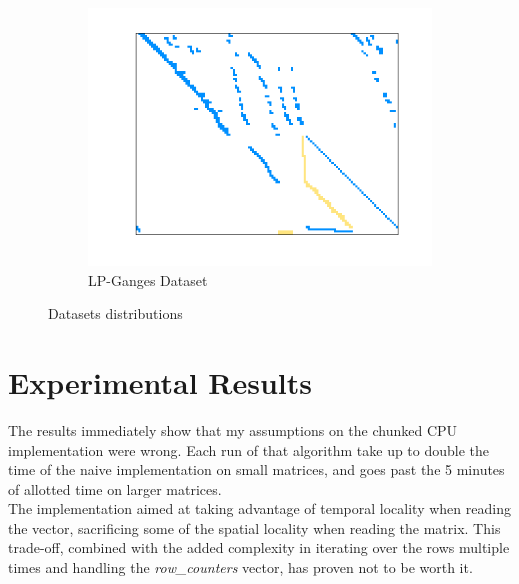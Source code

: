 \documentclass[conference]{IEEEtran}
\begin{document}
\begin{figure}
\begin{subfigure}[b]{0.45\linewidth}
        \includegraphics[width=\linewidth]{images/lp_ganges.png}
        \caption{LP-Ganges Dataset}
        \label{fig:lp_ganges}
    \end{subfigure}
    
    \caption{Datasets distributions}
    \label{fig:Dataset-images}
\end{figure}

\section{Experimental Results}
% 

The results immediately show that my assumptions on the chunked CPU implementation were wrong. Each run of that algorithm take up to double the time of the naive implementation on small matrices, and goes past the 5 minutes of allotted time on larger matrices.\\
The implementation aimed at taking advantage of temporal locality when reading the vector, sacrificing some of the spatial locality when reading the matrix. This trade-off, combined with the added complexity in iterating over the rows multiple times and handling the \textit{row\_counters} vector, has proven not to be worth it.
\end{document}
